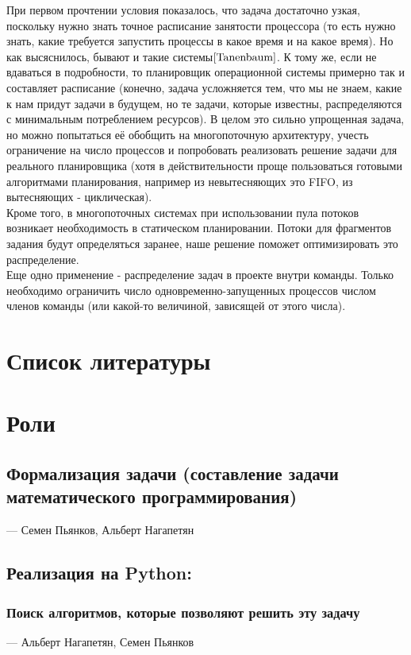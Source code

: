 \documentclass{article}
\begin{document}
При первом прочтении условия показалось, что задача достаточно узкая, поскольку нужно знать точное расписание занятости процессора (то есть нужно знать, какие требуется запустить процессы в какое время и на какое время). Но как высяснилось, бывают и такие системы$\cite{Tanenbaum}$. К тому же, если не вдаваться в подробности, то планировщик операционной системы примерно так и составляет расписание (конечно, задача усложняется тем, что мы не знаем, какие к нам придут задачи в будущем, но те задачи, которые известны, распределяются с минимальным потреблением ресурсов). В целом это сильно упрощенная задача, но можно попытаться её обобщить на многопоточную архитектуру, учесть ограничение на число процессов и попробовать реализовать решение задачи для реального планировщика (хотя в действительности проще пользоваться готовыми алгоритмами планирования, например из невытесняющих это FIFO, из вытесняющих - циклическая).\\

Кроме того, в многопоточных системах при использовании пула потоков возникает необходимость в статическом планировании. Потоки для фрагментов задания будут определяться заранее, наше решение поможет оптимизировать это распределение.\\

Еще одно применение - распределение задач в проекте внутри команды. Только необходимо ограничить число одновременно-запущенных процессов числом членов команды (или какой-то величиной, зависящей от этого числа).\\


\section{Список литературы}


\section{Роли}

\subsection{Формализация задачи (составление задачи математического программирования)} --- Семен Пьянков, Альберт Нагапетян
\subsection{Реализация на Python:}
    \subsubsection{Поиск алгоритмов, которые позволяют решить эту задачу} --- Альберт Нагапетян, Семен Пьянков
\end{document}
